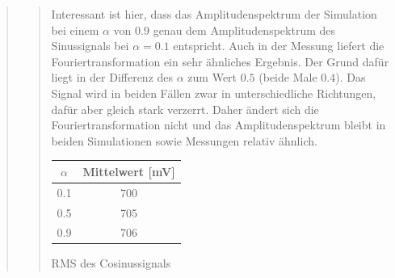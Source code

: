 \begin{quote}
\begin{quote}
            Interessant ist hier, dass das Amplitudenspektrum der Simulation
            bei einem $\alpha$ von $0.9$ genau dem Amplitudenspektrum des
            Sinussignals bei $\alpha = 0.1$ entspricht. Auch in der Messung
            liefert die Fouriertransformation ein sehr ähnliches Ergebnis. Der
            Grund dafür liegt in der Differenz des $\alpha$ zum Wert $0.5$
            (beide Male $0.4$).
            Das Signal wird in beiden Fällen zwar in unterschiedliche Richtungen,
            dafür aber gleich stark verzerrt. Daher ändert sich die
            Fouriertransformation nicht und das Amplitudenspektrum bleibt in
            beiden Simulationen sowie Messungen relativ ähnlich.
                                         
            \begin{center}
                  \begin{tabular}{|c|c|}
                  \hline
                   $\alpha $ &  Mittelwert [mV] \\ \hline 
                   0.1 &  700 \\ \hline
                   0.5 &  705 \\ \hline
                   0.9 &  706 \\ \hline           
                 \end{tabular}
                       \caption{RMS des Cosinussignals}
                        \label{tablelabel1}
                        
            \end{center}
        
    \end{quote}


    
    


    
        
\end{quote}


